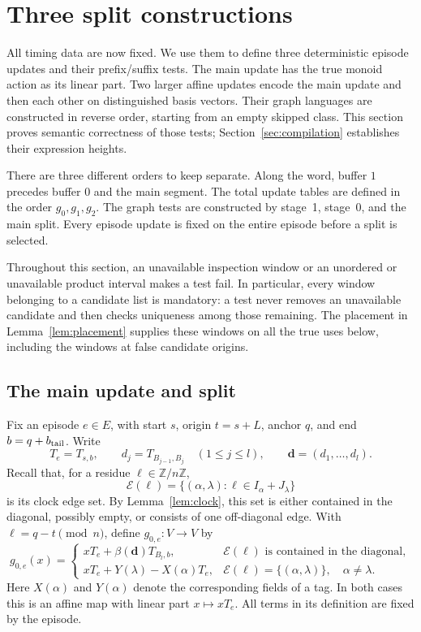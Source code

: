 \section{Three split constructions}
\label{sec:splits}

All timing data are now fixed. We use them to define three deterministic
episode updates and their prefix/suffix tests. The main update has the
true monoid action as its linear part. Two larger affine updates encode
the main update and then each other on distinguished basis vectors.
Their graph languages are constructed in reverse order, starting from
an empty skipped class. This section proves semantic correctness of those
tests; Section~\ref{sec:compilation} establishes their expression heights.

There are three different orders to keep separate. Along the word, buffer
$1$ precedes buffer $0$ and the main segment. The total update tables are
defined in the order $g_0,g_1,g_2$. The graph tests are constructed by
stage~1, stage~0, and the main split. Every episode update is fixed on the
entire episode before a split is selected.

Throughout this section, an unavailable inspection window or an unordered
or unavailable product interval makes a test fail.  In particular, every
window belonging to a candidate list is mandatory: a test never removes
an unavailable candidate and then checks uniqueness among those remaining.
The placement in Lemma~\ref{lem:placement} supplies these windows on all
the true uses below, including the windows at false candidate origins.

\subsection{The main update and split}

Fix an episode $e\in E$, with start $s$, origin $t=s+L$, anchor $q$, and
end $b=q+b_{\rm tail}$.  Write
\[
 T_e=T_{s,b},\qquad d_j=T_{B_{j-1},B_j}\quad(1\leq j\leq l),
 \qquad \mathbf d=(d_1,\ldots,d_l).
\]
Recall that, for a residue $\ell\in\mathbb Z/n\mathbb Z$,
\[
 \mathcal E(\ell)
 =\{(\alpha,\lambda):\ell\in I_\alpha+J_\lambda\}
\]
is its clock edge set.  By Lemma~\ref{lem:clock}, this set is either
contained in the diagonal, possibly empty, or consists of one
off-diagonal edge.  With $\ell=q-t\pmod n$, define $g_{0,e}:V\to V$ by
\begin{equation}
\label{eq:main-update}
 g_{0,e}(x)=
 \begin{cases}
 xT_e+\beta(\mathbf d)T_{B_l,b},
   &\mathcal E(\ell)\text{ is contained in the diagonal},\\[2mm]
 xT_e+Y(\lambda)-X(\alpha)T_e,
   &\mathcal E(\ell)=\{(\alpha,\lambda)\},\quad\alpha\ne\lambda.
 \end{cases}
\end{equation}
Here $X(\alpha)$ and $Y(\alpha)$ denote the corresponding fields of a
tag.  In both cases this is an affine map with linear part $x\mapsto xT_e$.
All terms in its definition are fixed by the episode.


